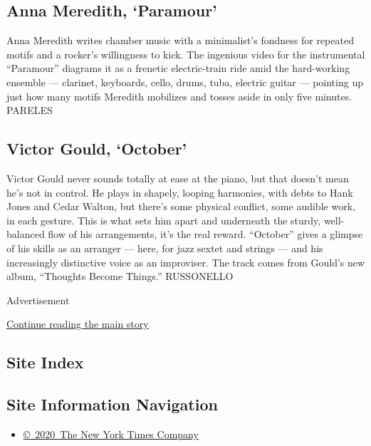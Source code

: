 \hypertarget{anna-meredith-paramour}{%
\subsection{Anna Meredith, `Paramour'}\label{anna-meredith-paramour}}

Anna Meredith writes chamber music with a minimalist's fondness for
repeated motifs and a rocker's willingness to kick. The ingenious video
for the instrumental ``Paramour'' diagrams it as a frenetic
electric-train ride amid the hard-working ensemble --- clarinet,
keyboards, cello, drums, tuba, electric guitar --- pointing up just how
many motifs Meredith mobilizes and tosses aside in only five minutes.
PARELES

\hypertarget{victor-gould-october}{%
\subsection{Victor Gould, `October'}\label{victor-gould-october}}

Victor Gould never sounds totally at ease at the piano, but that doesn't
mean he's not in control. He plays in shapely, looping harmonies, with
debts to Hank Jones and Cedar Walton, but there's some physical
conflict, some audible work, in each gesture. This is what sets him
apart and underneath the sturdy, well-balanced flow of his arrangements,
it's the real reward. ``October'' gives a glimpse of his skills as an
arranger --- here, for jazz sextet and strings --- and his increasingly
distinctive voice as an improviser. The track comes from Gould's new
album, ``Thoughts Become Things.'' RUSSONELLO

Advertisement

\protect\hyperlink{after-bottom}{Continue reading the main story}

\hypertarget{site-index}{%
\subsection{Site Index}\label{site-index}}

\hypertarget{site-information-navigation}{%
\subsection{Site Information
Navigation}\label{site-information-navigation}}

\begin{itemize}
\tightlist
\item
  \href{https://help.nytimes.com/hc/en-us/articles/115014792127-Copyright-notice}{©~2020~The
  New York Times Company}
\end{itemize}

